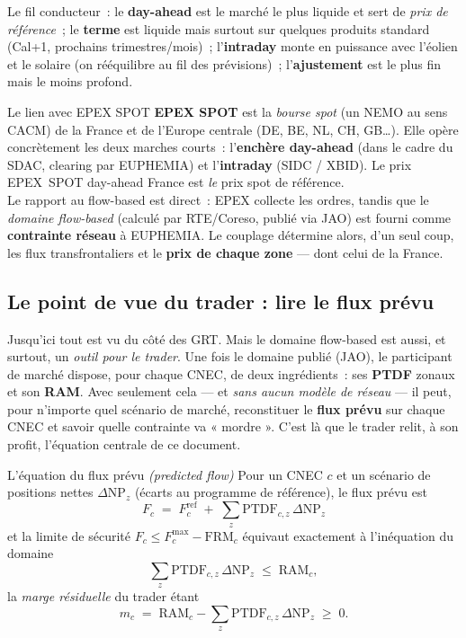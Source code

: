 \documentclass[11pt,a4paper]{article}
\newcommand{\NP}{\mathrm{NP}}
\newcommand{\PTDF}{\mathrm{PTDF}}
\newcommand{\RAM}{\mathrm{RAM}}
\newcommand{\Fmax}{F^{\max}}
\newcommand{\Fref}{F^{\mathrm{ref}}}
\newcommand{\FRM}{\mathrm{FRM}}
\begin{document}
\noindent Le fil conducteur~: le \textbf{day-ahead} est le marché le plus
liquide et sert de \emph{prix de référence}~; le \textbf{terme} est liquide
mais surtout sur quelques produits standard (Cal+1, prochains
trimestres/mois)~; l'\textbf{intraday} monte en puissance avec l'éolien et le
solaire (on rééquilibre au fil des prévisions)~; l'\textbf{ajustement} est le
plus fin mais le moins profond.

\begin{rembox}{Le lien avec EPEX SPOT}
\textbf{EPEX SPOT} est la \emph{bourse spot} (un NEMO au sens CACM) de la
France et de l'Europe centrale (DE, BE, NL, CH, GB\ldots). Elle opère
concrètement les deux marches courts~: l'\textbf{enchère day-ahead} (dans le
cadre du SDAC, clearing par EUPHEMIA) et l'\textbf{intraday} (SIDC / XBID).
Le prix EPEX~SPOT day-ahead France est \emph{le} prix spot de référence.\\[3pt]
Le rapport au flow-based est direct~: EPEX collecte les ordres, tandis que le
\emph{domaine flow-based} (calculé par RTE/Coreso, publié via JAO) est fourni
comme \textbf{contrainte réseau} à EUPHEMIA. Le couplage détermine alors, d'un
seul coup, les flux transfrontaliers et le \textbf{prix de chaque zone} — dont
celui de la France.
\end{rembox}

\subsection{Le point de vue du trader : lire le flux prévu}
\label{sec:trader}

Jusqu'ici tout est vu du côté des GRT. Mais le domaine flow-based est aussi,
et surtout, un \emph{outil pour le trader}. Une fois le domaine publié (JAO),
le participant de marché dispose, pour chaque CNEC, de deux ingrédients~: ses
\textbf{PTDF} zonaux et son \textbf{RAM}. Avec seulement cela — et \emph{sans
aucun modèle de réseau} — il peut, pour n'importe quel scénario de marché,
reconstituer le \textbf{flux prévu} sur chaque CNEC et savoir quelle contrainte
va « mordre ». C'est là que le trader relit, à son profit, l'équation centrale
de ce document.

\begin{defbox}{L'équation du flux prévu \textit{(predicted flow)}}
Pour un CNEC $c$ et un scénario de positions nettes $\Delta\NP_z$ (écarts au
programme de référence), le flux prévu est
\[
  \boxed{\;F_c \;=\; \Fref_c \;+\; \sum_z \PTDF_{c,z}\,\Delta\NP_z\;}
\]
et la limite de sécurité $F_c \le \Fmax_c-\FRM_c$ équivaut exactement à
l'inéquation du domaine
\[
  \sum_z \PTDF_{c,z}\,\Delta\NP_z \;\le\; \RAM_c ,
\]
la \emph{marge résiduelle} du trader étant
\[
  m_c \;=\; \RAM_c - \sum_z \PTDF_{c,z}\,\Delta\NP_z \;\ge\; 0 .
\]
\end{defbox}
\end{document}
